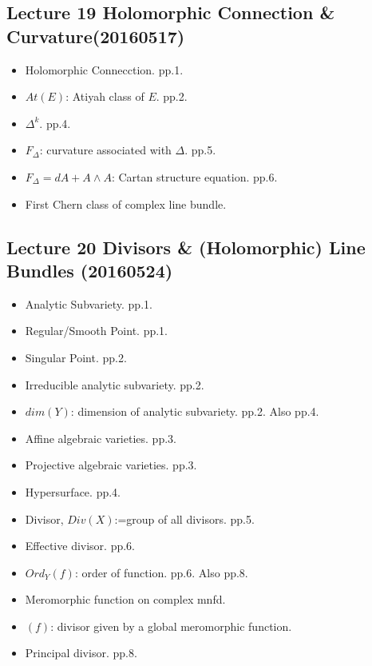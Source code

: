 \documentclass{article}
\numberwithin{equation}{subsection} %
\begin{document}
	\subsection{Lecture 19 Holomorphic Connection \& Curvature(20160517)}
	\begin{itemize}
		\item Holomorphic Connecction. pp.1.
		\item $At(E)$: Atiyah class of $E$. pp.2.
		\item $\Delta^k$. pp.4.
		\item $F_\Delta$: curvature associated with $\Delta$. pp.5.
		\item $F_\Delta = dA + A\wedge A$: Cartan structure equation. pp.6.
		\item First Chern class of complex line bundle.
	\end{itemize}
	
	\subsection{Lecture 20 Divisors \& (Holomorphic) Line Bundles (20160524)}
	\begin{itemize}
		\item Analytic Subvariety. pp.1.
		\item Regular/Smooth Point. pp.1.
		\item Singular Point. pp.2.
		\item Irreducible analytic subvariety. pp.2.
		\item $dim(Y)$: dimension of analytic subvariety. pp.2. Also pp.4.
		\item Affine algebraic varieties. pp.3.
		\item Projective algebraic varieties. pp.3.
		\item Hypersurface. pp.4.
		\item Divisor, $Div(X)$:=group of all divisors. pp.5.
		\item Effective divisor. pp.6.
		\item $Ord_Y(f)$: order of function. pp.6. Also pp.8.
		\item Meromorphic function on complex mnfd.
		\item $(f)$: divisor given by a global meromorphic function.
		\item Principal divisor. pp.8.
	\end{itemize}
	
\end{document}
